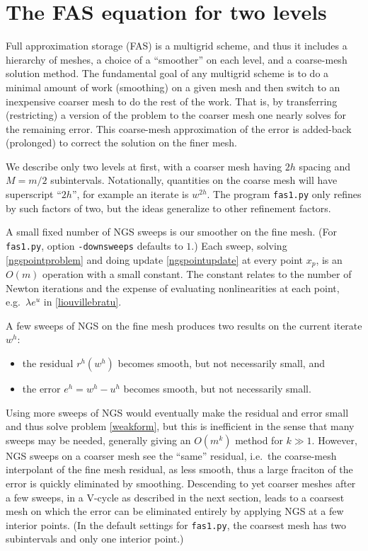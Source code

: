 \documentclass[letterpaper,final,12pt,reqno]{amsart}
\begin{document}
\section{The FAS equation for two levels}

Full approximation storage (FAS) \cite{Brandt1977,Briggsetal2000} is a multigrid scheme, and thus it includes a hierarchy of meshes, a choice of a ``smoother'' on each level, and a coarse-mesh solution method.  The fundamental goal of any multigrid scheme is to do a minimal amount of work (smoothing) on a given mesh and then switch to an inexpensive coarser mesh to do the rest of the work.  That is, by transferring (restricting) a version of the problem to the coarser mesh one nearly solves for the remaining error.  This coarse-mesh approximation of the error is added-back (prolonged) to correct the solution on the finer mesh.

We describe only two levels at first, with a coarser mesh having $2h$ spacing and $M=m/2$ subintervals.  Notationally, quantities on the coarse mesh will have superscript ``$2h$'', for example an iterate is $w^{2h}$.  The program \texttt{fas1.py} only refines by such factors of two, but the ideas generalize to other refinement factors.

A small fixed number of NGS sweeps is our smoother on the fine mesh.  (For \texttt{fas1.py}, option \texttt{-downsweeps} defaults to $1$.)  Each sweep, solving \eqref{ngspointproblem} and doing update \eqref{ngspointupdate} at every point $x_p$, is an $O(m)$ operation with a small constant.  The constant relates to the number of Newton iterations and the expense of evaluating nonlinearities at each point, e.g.~$\lambda e^u$ in \eqref{liouvillebratu}.

A few sweeps of NGS on the fine mesh produces two results on the current iterate $w^h$:
\begin{itemize}
\item the residual $r^h(w^h)$ becomes smooth, but not necessarily small, and
\item the error $e^h = w^h - u^h$ becomes smooth, but not necessarily small.
\end{itemize}

Using more sweeps of NGS would eventually make the residual and error small and thus solve problem \eqref{weakform}, but this is inefficient in the sense that many sweeps may be needed, generally giving an $O(m^k)$ method for $k\gg 1$.  However, NGS sweeps on a coarser mesh see the ``same'' residual, i.e.~the coarse-mesh interpolant of the fine mesh residual, as less smooth, thus a large fraciton of the error is quickly eliminated by smoothing.  Descending to yet coarser meshes after a few sweeps, in a V-cycle as described in the next section, leads to a coarsest mesh on which the error can be eliminated entirely by applying NGS at a few interior points.  (In the default settings for \texttt{fas1.py}, the coarsest mesh has two subintervals and only one interior point.)
\end{document}
